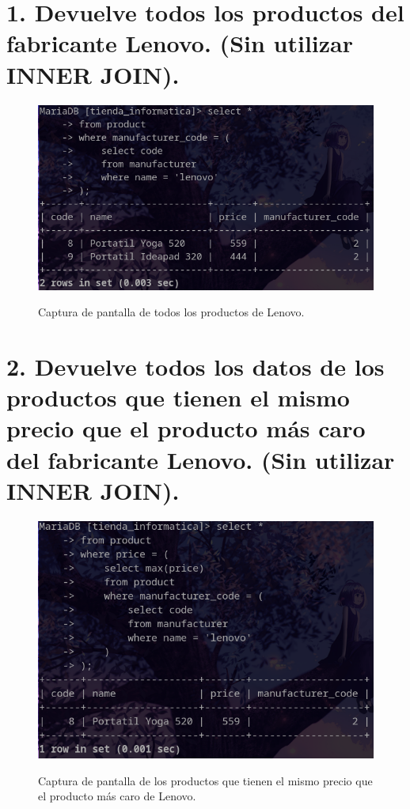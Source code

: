 \documentclass{article}
\begin{document}
\section*{1. Devuelve todos los productos del fabricante Lenovo. (Sin utilizar INNER JOIN).}

\begin{figure}[ht]
    \centering
    {
        \includegraphics[width=\linewidth]{05screenshot.png} %
    }
    \caption{Captura de pantalla de todos los productos de Lenovo.}
\end{figure}
\newpage %

\section*{2. Devuelve todos los datos de los productos que tienen el mismo precio que el producto más caro 
del fabricante Lenovo. (Sin utilizar INNER JOIN).}

\begin{figure}[ht]
    \centering
    {
        \includegraphics[width=\linewidth]{06screenshot.png} %
    }
    \caption{Captura de pantalla de los productos que tienen el mismo precio que el producto más caro de Lenovo.}
\end{figure}
\newpage %
\end{document}
